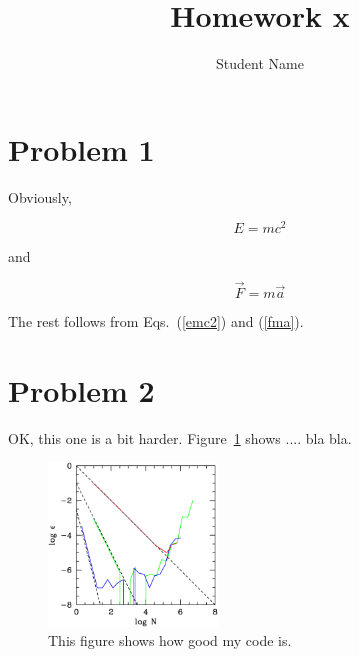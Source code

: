
\pagestyle{plain}
\baselineskip 18pt
\textwidth 6.5in
\textheight 7.8in
\oddsidemargin 0.1in
\evensidemargin 0.1in
\topmargin 0.3in
\parindent 0pt

\newcommand{\beq}{\begin{equation}}
\newcommand{\eeq}{\end{equation}}



\title{Homework x}
\author{Student Name}
\maketitle

\section{Problem 1}

Obviously,

\beq
E=m c^2
\label{emc2}
\eeq

and

\beq
\vec{F} = m \vec{a}
\label{fma}
\eeq

The rest follows from Eqs.~(\ref{emc2}) and (\ref{fma}).

\section{Problem 2}


OK, this one is a bit harder. Figure~\ref{figeps} shows .... bla bla.

\begin{figure}[h]
\begin{center}
\includegraphics[width=0.4\textwidth]{figure1.ps}
\caption{This figure shows how good my code is.}
\label{figeps}
\end{center}
\end{figure}




